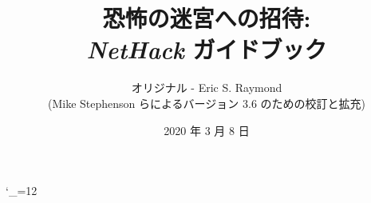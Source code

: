 \textheight 220mm
\textwidth 160mm
\oddsidemargin 0mm
\evensidemargin 0mm
\topmargin 0mm

\newcommand{\nd}{\noindent}

\newcommand{\tb}[1]{\tt #1 \hfill}
\newcommand{\bb}[1]{\bf #1 \hfill}
\newcommand{\ib}[1]{\it #1 \hfill}

\newcommand{\blist}[1]
{\begin{list}{$\bullet$}
    {\leftmargin 30mm \topsep 2mm \partopsep 0mm \parsep 0mm \itemsep 1mm
     \labelwidth 28mm \labelsep 2mm
     #1}}

\newcommand{\elist}{\end{list}}

\catcode`\_=12



\title{\LARGE 恐怖の迷宮への招待:\\
\Large {\it NetHack\/} ガイドブック}

\author{オリジナル - Eric S. Raymond\\
(Mike Stephenson らによるバージョン 3.6 のための校訂と拡充)}
\date{2020 年 3 月 8 日}

